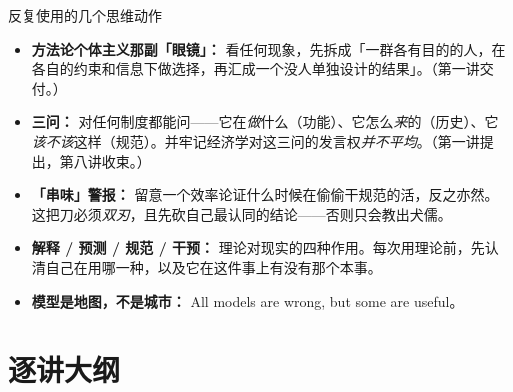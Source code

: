 \documentclass[10pt,a4paper]{ctexart}
\begin{document}
\begin{insightbox}{反复使用的几个思维动作}
\begin{itemize}
  \item \textbf{方法论个体主义那副「眼镜」：} 看任何现象，先拆成「一群各有目的的人，在各自的约束和信息下做选择，再汇成一个没人单独设计的结果」。（第一讲交付。）
  \item \textbf{三问：} 对任何制度都能问——它在\emph{做}什么（功能）、它怎么\emph{来}的（历史）、它\emph{该不该}这样（规范）。并牢记经济学对这三问的发言权\emph{并不平均}。（第一讲提出，第八讲收束。）
  \item \textbf{「串味」警报：} 留意一个效率论证什么时候在偷偷干规范的活，反之亦然。这把刀必须\emph{双刃}，且先砍自己最认同的结论——否则只会教出犬儒。
  \item \textbf{解释 / 预测 / 规范 / 干预：} 理论对现实的四种作用。每次用理论前，先认清自己在用哪一种，以及它在这件事上有没有那个本事。
  \item \textbf{模型是地图，不是城市：} All models are wrong, but some are useful。
\end{itemize}
\end{insightbox}




\section{逐讲大纲}
\end{document}
